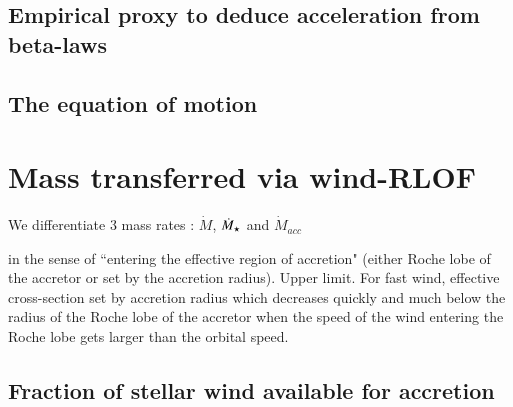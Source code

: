\documentclass[letter]{aa}
\newcommand{\mystar}{{\fontfamily{lmr}\selectfont$\star$}}
\begin{document}
\subsection{Empirical proxy to deduce acceleration from beta-laws}
\label{sec:}

\subsection{The equation of motion}
\label{sec:}

\section{Mass transferred via wind-RLOF}
\label{sec:}

We differentiate 3 mass rates : $\dot{M}$, $\dot{M}_{\text{\mystar}}$ and $\dot{M}_{acc}$

in the sense of “entering the effective region of accretion" (either Roche lobe of the accretor or set by the accretion radius). Upper limit. For fast wind, effective cross-section set by accretion radius which decreases quickly and much below the radius of the Roche lobe of the accretor when the speed of the wind entering the Roche lobe gets larger than the orbital speed.

\subsection{Fraction of stellar wind available for accretion}
\label{sec:}
\end{document}
